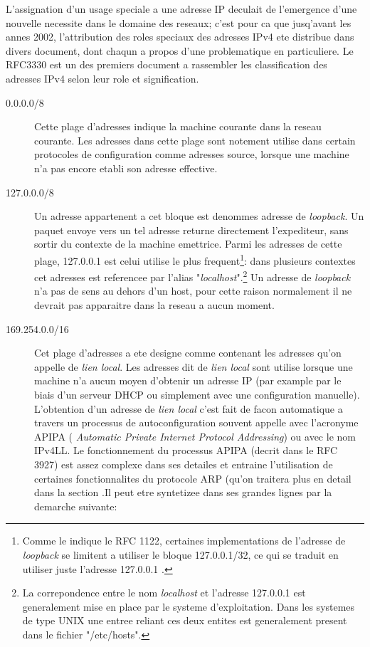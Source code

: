 L'assignation d'un usage speciale a une adresse IP deculait de l'emergence
d'une nouvelle necessite dans le domaine des reseaux; c'est pour
ca que jusq'avant les annes 2002, l'attribution des roles speciaux des adresses
IPv4 ete distribue dans divers document, dont chaqun a propos d'une
problematique en particuliere. Le RFC3330 est un des premiers document a
rassembler les classification des adresses IPv4 selon leur role et signification.


\begin{description}
\item[0.0.0.0/8]
Cette plage d'adresses indique la machine courante dans la reseau courante.
Les adresses dans cette plage sont notement utilise dans certain protocoles de
configuration comme adresses source, lorsque une machine n'a pas encore etabli
son adresse effective.

\item[127.0.0.0/8]
Un adresse appartenent a cet bloque est denommes adresse de {\it loopback}.  Un
paquet envoye vers un tel adresse returne directement l'expediteur, sans sortir
du contexte de la machine emettrice. Parmi les adresses de cette plage,
127.0.0.1 est celui utilise le plus frequent\footnote{Comme le indique
le RFC 1122, certaines implementations de l'adresse de {\it loopback} se
limitent a utiliser le bloque 127.0.0.1/32, ce qui se traduit en utiliser juste
l'adresse 127.0.0.1 .}: dans plusieurs contextes cet adresses est referencee par
l'alias "{\it localhost}".\footnote{La correpondence entre le nom {\it localhost} et
l'adresse 127.0.0.1 est generalement mise en place par le systeme d'exploitation.
Dans les systemes de type UNIX une entree reliant ces deux entites est generalement
present dans le fichier "/etc/hosts".}
Un adresse de {\it loopback} n'a pas de sens au dehors
d'un host, pour cette raison normalement il ne devrait pas apparaitre dans la
reseau a aucun moment.


\item[169.254.0.0/16]
Cet plage d'adresses a ete designe comme contenant les adresses qu'on appelle
de {\it lien local}.  Les adresses dit de {\it lien local} sont utilise lorsque
une machine n'a aucun moyen d'obtenir un adresse IP (par example par le biais
d'un serveur DHCP ou simplement avec une configuration manuelle).  L'obtention
d'un adresse de {\it lien local} c'est fait de facon automatique a travers un
processus de autoconfiguration souvent appelle avec l'acronyme APIPA ({\it
Automatic Private Internet Protocol Addressing}) ou avec le nom IPv4LL.  Le
fonctionnement du processus APIPA (decrit dans le RFC 3927) est assez complexe
dans ses detailes et entraine l'utilisation de certaines fonctionnalites du
protocole ARP (qu'on traitera plus en detail dans la section %
.Il peut etre syntetizee dans ses grandes lignes par la demarche suivante:


\end{description}

